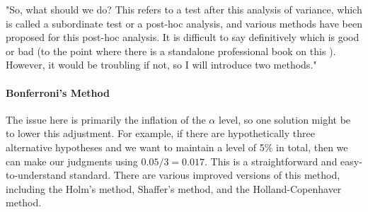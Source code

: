 \documentclass{ltjsarticle}
\begin{document}
"So, what should we do? This refers to a test after this analysis of variance, which is called a subordinate test or a post-hoc analysis, and various methods have been proposed for this post-hoc analysis. It is difficult to say definitively which is good or bad (to the point where there is a standalone professional book on this \parencite{BA33892274}). However, it would be troubling if not, so I will introduce two methods."

\paragraph{Bonferroni's Method} The issue here is primarily the inflation of the $\alpha$ level, so one solution might be to lower this adjustment. For example, if there are hypothetically three alternative hypotheses and we want to maintain a level of 5\% in total, then we can make our judgments using $0.05/3=0.017$. This is a straightforward and easy-to-understand standard. There are various improved versions of this method, including the Holm's method, Shaffer's method, and the Holland-Copenhaver method.

\end{document}
